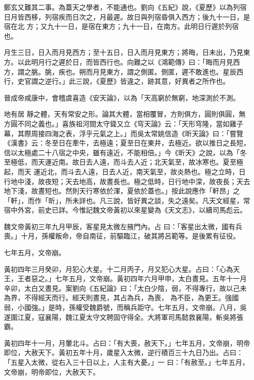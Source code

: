 \begin{pinyinscope}
 鄭玄又難其二事。為蓋天之學者，不能通也。劉向《五紀》說，《夏歷》以為列宿日月皆西移，列宿疾而日次之，月最遲。故日與列宿昏俱入西方；後九十一日，是宿在北
 方；又九十一日，是宿在東方；九十一日，在南方。此明日行遲於列宿也。



 月生三日，日入而月見西方；至十五日，日入而月見東方；將晦，日未出，乃見東方。以此明月行之遲於日，而皆西行也。向難之以《鴻範傳》曰：「晦而月見西方，謂之朓。朓，疾也。朔而月見東方，謂之側匿。側匿，遲不敢進也。星辰西行，史官謂之逆行。」此三說，《夏歷》皆違之，跡其意，好異者之所作也。



 晉成帝咸康中，會稽虞喜造《安天論》，以為「天高窮於無窮，地深測於不測。



 地有居
 靜之體，天有常安之形。論其大體，當相覆冒，方則俱方，圓則俱圓，無方圓不同之義也。」喜族祖河間太守聳又立《穹天論》云：「天形穹隆，當如雞子幕，其際周接四海之表，浮乎元氣之上。」而吳太常姚信造《昕天論》曰：「嘗覽《漢書》云：冬至日在牽牛，去極遠；夏至日在東井，去極近。欲以推日之長短，信以太極處二十八宿之中央，雖有遠近，不能相倍。」今《昕天》之說，以為「冬至極低，而天運近南。故日去人遠，而斗去人近；北天氣至，故冰寒也。夏至極起，而天
 運近北，而斗去人遠，日去人近，南天氣至，故炎熱也。極之立時，日行地中淺，故夜短；天去地高，故晝長也。極之低時，日行地中深，故夜長；天去地下淺，故晝短也。然則天行寒依於渾，夏依於蓋也。」按此說應作「軒昂」之「軒」，而作「昕」，所未詳也。凡三說，皆好異之談，失之遠矣。凡天文經星，常宿中外宮，前史已詳。今惟記魏文帝黃初以來星變為《天文志》，以續司馬彪云。



 魏文帝黃初三年九月甲辰，客星見太微左掖門內。占
 曰：「客星出太微，國有兵喪。」十月，孫權叛命，帝自南征，前驅臨江，破其將呂範等。是後累有征役。



 七年五月，文帝崩。



 黃初四年三月癸卯，月犯心大星。十二月丙子，月又犯心大星。占曰：「心為天王，王者惡之。」七年五月，文帝崩。黃初四年六月甲申，太白晝見。五年十一月辛卯，太白又晝見。案劉向《五紀論》曰：「太白少陰，弱，不得專行，故以己未為界，不得經天而行。經天則晝見，其占為兵，為喪，
 為不臣，為更王。強國弱，小國強。」是時，孫權受魏爵號，而稱兵距守。七年五月，文帝崩。八月，吳遂圍江夏，寇襄陽，魏江夏太守文聘固守得全。大將軍司馬懿救襄陽，斬吳將張霸。



 黃初四年十一月，月暈北斗。占曰：「有大喪，赦天下。」七年五月，文帝崩，明帝即位，大赦天下。黃初五年十月，歲星入太微，逆行積百三十九日乃出。占曰：「五星入太微，從右入三十日以上，人主有大憂。」一
 曰：「有赦至。」七年五月，文帝崩，明帝即位，大赦天下。




\end{pinyinscope}
